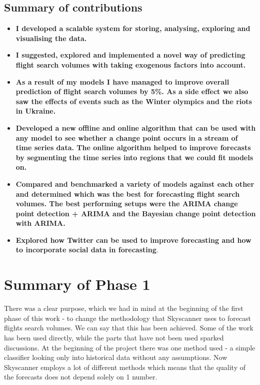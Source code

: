 \documentclass[minf,twoside,singlespacing,parskip,frontabs,notimes,12pt]{infthesis} %
\begin{document}
\section{Summary of contributions}

\begin{itemize}
\item \textbf{I developed a scalable system for storing, analysing, exploring and visualising the data.}
\item \textbf{I suggested, explored and implemented a novel way of predicting flight search volumes with taking exogenous factors into account.}
\item \textbf{As a result of my models I have managed to improve overall prediction of flight search volumes by 5\%. As a side effect we also saw the effects of events such as the Winter olympics and the riots in Ukraine.} 
\item \textbf{Developed a new offline and online algorithm that can be used with any model to see whether a change point occurs in a stream of time series data. The online algorithm helped to improve forecasts by segmenting the time series into regions that we could fit models on.} 
\item \textbf{Compared and benchmarked a variety of models against each other and determined which was the best for forecasting flight search volumes. The best performing setups were the ARIMA change point detection + ARIMA and the Bayesian change point detection with ARIMA.}
\item \textbf{Explored how Twitter can be used to improve forecasting and how to incorporate social data in forecasting}.
\end{itemize}



\chapter{Summary of Phase 1}

There was a clear purpose, which we had in mind at the beginning of the first phase of this work - to change the methodology that Skyscanner uses to forecast flights search volumes. We can say that this has been achieved. Some of the work has been used directly, while the parts that have not been used sparked discussions. At the beginning of the project there was one method used - a simple classifier looking only into historical data without any assumptions. Now Skyscanner employs a lot of different methods which means that the quality of the forecasts does not depend solely on 1 number. 
\end{document}
